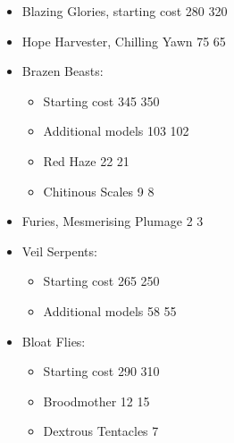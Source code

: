 \begin{itemize}
\item Blazing Glories, starting cost 280 \costup{} 320
\item Hope Harvester, Chilling Yawn 75 \costdown{} 65
\item Brazen Beasts:
\begin{itemize}
\item Starting cost 345 \costup{} 350
\item Additional models 103\permodel{} \costdown{} 102\permodel{}
\item Red Haze 22\permodel{} \costdown{} 21\permodel{}
\item Chitinous Scales 9\permodel{} \costdown{} 8\permodel{}
\end{itemize}
\item Furies, Mesmerising Plumage 2\permodel{} \costup{} 3\permodel{}
\item Veil Serpents:
\begin{itemize}
\item Starting cost 265 \costdown{} 250
\item Additional models 58\permodel{} \costdown{} 55\permodel{}
\end{itemize}
\item Bloat Flies:
\begin{itemize}
\item Starting cost 290 \costup{} 310
\item Broodmother 12\permodel{} \costup{} 15\permodel{}
\item Dextrous Tentacles 7\permodel{}
\end{itemize}
\end{itemize}
